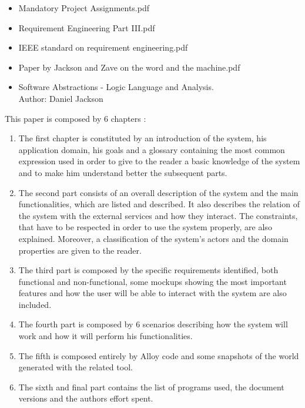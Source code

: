 \begin{itemize}
	\setlength{\leftskip}{0.5cm}
	\item Mandatory Project Assignments.pdf
	\item Requirement Engineering Part III.pdf
	\item IEEE standard on requirement engineering.pdf
	\item Paper by Jackson and Zave on the word and the machine.pdf
	\item Software Abstractions - Logic Language and Analysis.\\
	Author: Daniel Jackson
\end{itemize}

This paper is composed by 6 chapters :
\begin{enumerate}
	\setlength{\leftskip}{0.5cm}
	\item The first chapter is constituted by an introduction of the system, his application domain, his goals and a glossary containing the most common expression used in order to give to the reader a basic knowledge of the system and to make him understand better the subsequent parts.
	\item The second part consists of an overall description of the system and the main functionalities, which are listed and described. It also describes the relation of the system with the external services and how they interact. The constraints, that have to be respected in order to use the system properly, are also explained.
	Moreover, a classification of the system’s actors and the domain properties are given to the reader.
	\item The third part is composed by the specific requirements identified, both functional and non-functional, some mockups showing the most important features and how the user will be able to interact with the system are also included.
	\item The fourth part is composed by 6 scenarios describing how the system will work and how it will perform his functionalities.
	\item The fifth is composed entirely by Alloy code and some snapshots of the world generated with the related tool.
	\item The sixth and final part contains the list of programs used, the document versions and the authors effort spent.
\end{enumerate}